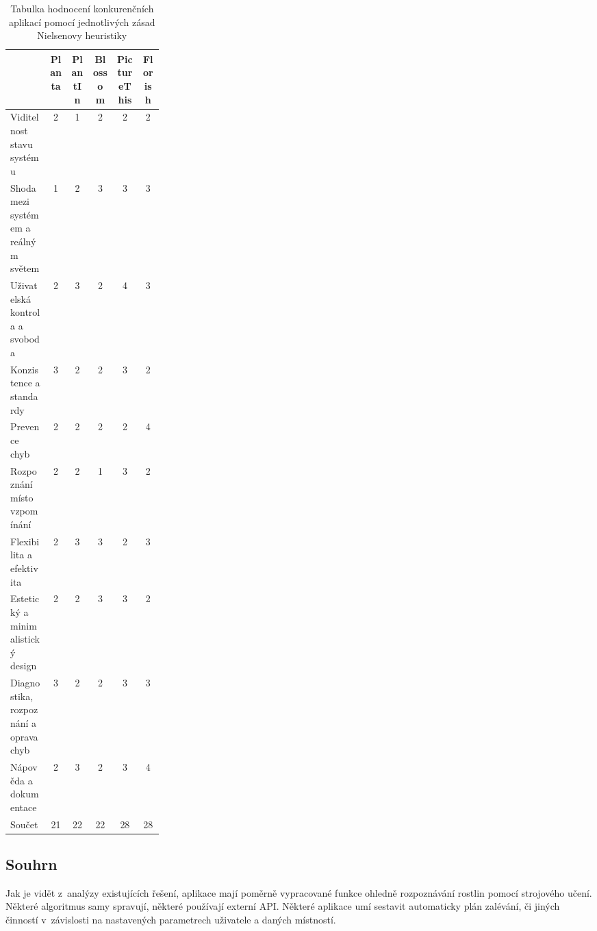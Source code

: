 \documentclass[thesis=M,czech]{FITthesis}[2019/12/23]
\begin{document}
\begin{table}[H]
\begin{tabular}{|p{0.26\linewidth}|c|c|c|c|c|}
\hline
                                      & Planta & PlantIn & Blossom & PictureThis & Florish \\ \hline
Viditelnost stavu systému             & 2      & 1       & 2       & 2           & 2       \\ \hline
Shoda mezi systémem a reálným světem  & 1      & 2       & 3       & 3           & 3       \\ \hline
Uživatelská kontrola a svoboda        & 2      & 3       & 2       & 4           & 3       \\ \hline
Konzistence a standardy               & 3      & 2       & 2       & 3           & 2       \\ \hline
Prevence chyb                         & 2      & 2       & 2       & 2           & 4       \\ \hline
Rozpoznání místo vzpomínání           & 2      & 2       & 1       & 3           & 2       \\ \hline
Flexibilita a efektivita              & 2      & 3       & 3       & 2           & 3       \\ \hline
Estetický a minimalistický design     & 2      & 2       & 3       & 3           & 2       \\ \hline
Diagnostika, rozpoznání a oprava chyb & 3      & 2       & 2       & 3           & 3       \\ \hline
Nápověda a dokumentace                & 2      & 3       & 2       & 3           & 4       \\ \hline \hline
Součet                                & 21     & 22      & 22      & 28          & 28      \\ \hline
\end{tabular}
\caption{Tabulka hodnocení konkurenčních aplikací pomocí jednotlivých zásad Nielsenovy heuristiky}
\label{tab:nielsen}
\end{table}
    
\subsection{Souhrn}
Jak je vidět z~analýzy existujících řešení, aplikace mají poměrně vypracované funkce ohledně rozpoznávání rostlin pomocí strojového učení. Některé algoritmus samy spravují, některé používají externí API. Některé aplikace umí sestavit automaticky plán zalévání, či jiných činností v~závislosti na nastavených parametrech uživatele a daných místností.
\end{document}
